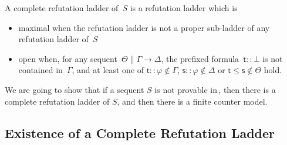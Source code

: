   \begin{definition}
   A complete refutation ladder of~$S$ is a refutation ladder which is
   \begin{itemize}
    \item maximal
	  when the refutation ladder is not a proper sub-ladder of any
	  refutation ladder of~$S$
    \item open when,
	  for any sequent~$\Theta\parallel \Gamma\longrightarrow \Delta$,
	  the prefixed formula~$\mathsf t::\bot$ is not contained
	  in~$\Gamma$, and at least one of
	  $\mathsf t::\varphi\notin \Gamma$,
	  $\mathsf s::\varphi\notin\Delta$ or $\mathsf t\le \mathsf s\notin
	  \Theta$ hold.
   \end{itemize}
  \end{definition}

  We are going to show that
  if a sequent $S$ is not provable in\,\LB, then there is a complete
  refutation ladder of $S$, and then there is a finite counter model.

   \subsection{Existence of a Complete Refutation Ladder}


